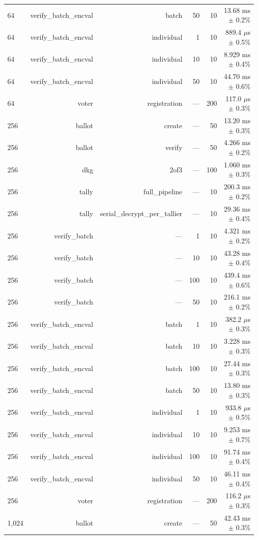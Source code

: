 \begin{table}[h]
\begin{tabular}{lrrrrr}
64 & verify\_batch\_encval & batch & 50 & 10 & 13.68 ms $\pm$ 0.2\% \\
64 & verify\_batch\_encval & individual & 1 & 10 & 889.4 $\mu$s $\pm$ 0.5\% \\
64 & verify\_batch\_encval & individual & 10 & 10 & 8.929 ms $\pm$ 0.4\% \\
64 & verify\_batch\_encval & individual & 50 & 10 & 44.70 ms $\pm$ 0.6\% \\
64 & voter & registration & — & 200 & 117.0 $\mu$s $\pm$ 0.3\% \\
256 & ballot & create & — & 50 & 13.20 ms $\pm$ 0.3\% \\
256 & ballot & verify & — & 50 & 4.266 ms $\pm$ 0.2\% \\
256 & dkg & 2of3 & — & 100 & 1.060 ms $\pm$ 0.3\% \\
256 & tally & full\_pipeline & — & 10 & 200.3 ms $\pm$ 0.2\% \\
256 & tally & serial\_decrypt\_per\_tallier & — & 10 & 29.36 ms $\pm$ 0.4\% \\
256 & verify\_batch & — & 1 & 10 & 4.321 ms $\pm$ 0.2\% \\
256 & verify\_batch & — & 10 & 10 & 43.28 ms $\pm$ 0.4\% \\
256 & verify\_batch & — & 100 & 10 & 439.4 ms $\pm$ 0.6\% \\
256 & verify\_batch & — & 50 & 10 & 216.1 ms $\pm$ 0.2\% \\
256 & verify\_batch\_encval & batch & 1 & 10 & 382.2 $\mu$s $\pm$ 0.3\% \\
256 & verify\_batch\_encval & batch & 10 & 10 & 3.228 ms $\pm$ 0.3\% \\
256 & verify\_batch\_encval & batch & 100 & 10 & 27.44 ms $\pm$ 0.3\% \\
256 & verify\_batch\_encval & batch & 50 & 10 & 13.80 ms $\pm$ 0.3\% \\
256 & verify\_batch\_encval & individual & 1 & 10 & 933.8 $\mu$s $\pm$ 0.5\% \\
256 & verify\_batch\_encval & individual & 10 & 10 & 9.253 ms $\pm$ 0.7\% \\
256 & verify\_batch\_encval & individual & 100 & 10 & 91.74 ms $\pm$ 0.4\% \\
256 & verify\_batch\_encval & individual & 50 & 10 & 46.11 ms $\pm$ 0.4\% \\
256 & voter & registration & — & 200 & 116.2 $\mu$s $\pm$ 0.3\% \\
1,024 & ballot & create & — & 50 & 42.43 ms $\pm$ 0.3\% \\

\end{tabular}
\end{table}
